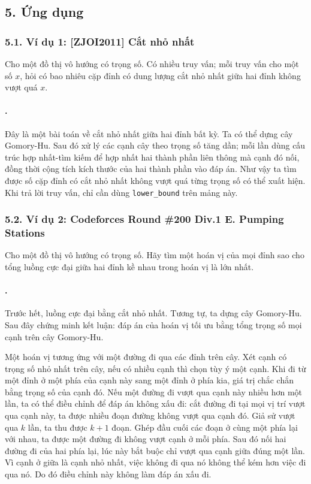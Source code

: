 \documentclass[11pt]{article}
\begin{document}
\subsection*{5. Ứng dụng}

\subsubsection*{5.1. Ví dụ 1: [ZJOI2011] Cắt nhỏ nhất}

Cho một đồ thị vô hướng có trọng số. Có nhiều truy vấn; mỗi truy vấn cho một
số \(x\), hỏi có bao nhiêu cặp đỉnh có dung lượng cắt nhỏ nhất giữa hai đỉnh
không vượt quá \(x\).

\paragraph{.}
Đây là một bài toán về cắt nhỏ nhất giữa hai đỉnh bất kỳ. Ta có thể dựng cây
Gomory-Hu. Sau đó xử lý các cạnh cây theo trọng số tăng dần; mỗi lần dùng cấu
trúc hợp nhất-tìm kiếm để hợp nhất hai thành phần liên thông mà cạnh đó nối,
đồng thời cộng tích kích thước của hai thành phần vào đáp án. Như vậy ta tìm
được số cặp đỉnh có cắt nhỏ nhất không vượt quá từng trọng số có thể xuất
hiện. Khi trả lời truy vấn, chỉ cần dùng \texttt{lower\_bound} trên mảng này.

\subsubsection*{5.2. Ví dụ 2: Codeforces Round \#200 Div.1 E. Pumping Stations}

Cho một đồ thị vô hướng có trọng số. Hãy tìm một hoán vị của mọi đỉnh sao cho
tổng luồng cực đại giữa hai đỉnh kề nhau trong hoán vị là lớn nhất.

\paragraph{.}
Trước hết, luồng cực đại bằng cắt nhỏ nhất. Tương tự, ta dựng cây Gomory-Hu.
Sau đây chứng minh kết luận: đáp án của hoán vị tối ưu bằng tổng trọng số mọi
cạnh trên cây Gomory-Hu.

Một hoán vị tương ứng với một đường đi qua các đỉnh trên cây. Xét cạnh có
trọng số nhỏ nhất trên cây, nếu có nhiều cạnh thì chọn tùy ý một cạnh. Khi đi
từ một đỉnh ở một phía của cạnh này sang một đỉnh ở phía kia, giá trị chắc
chắn bằng trọng số của cạnh đó. Nếu một đường đi vượt qua cạnh này nhiều hơn
một lần, ta có thể điều chỉnh để đáp án không xấu đi: cắt đường đi tại mọi vị
trí vượt qua cạnh này, ta được nhiều đoạn đường không vượt qua cạnh đó. Giả
sử vượt qua \(k\) lần, ta thu được \(k+1\) đoạn. Ghép đầu cuối các đoạn ở
cùng một phía lại với nhau, ta được một đường đi không vượt cạnh ở mỗi phía.
Sau đó nối hai đường đi của hai phía lại, lúc này bắt buộc chỉ vượt qua cạnh
giữa đúng một lần. Vì cạnh ở giữa là cạnh nhỏ nhất, việc không đi qua nó
không thể kém hơn việc đi qua nó. Do đó điều chỉnh này không làm đáp án xấu
đi.
\end{document}
